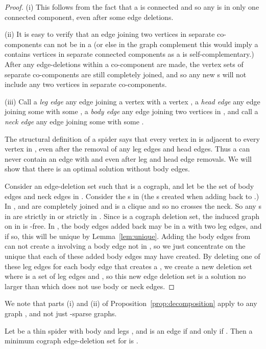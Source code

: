 \documentclass{llncs}
\begin{document}
\begin{proof}
 (i) This follows from the fact that a  is connected and so any  is in only one connected component, even after some edge deletions.

 (ii) It is easy to verify that an edge joining two vertices in separate co-components can not be in a  (or else in the graph complement this would imply a  contains vertices in separate connected components as a  is self-complementary.) After any edge-deletions within a co-component are made, the vertex sets of separate co-components are still completely joined, and so any new s will not include any two vertices in separate co-components.

 (iii) Call a \emph{leg edge} any edge joining a vertex  with a vertex , a \emph{head edge} any edge joining some  with some , a \emph{body edge} any edge joining two vertices in , and call a \emph{neck edge} any edge joining some  with some .
  
 The structural definition of a spider says that every vertex in  is adjacent to every vertex in , even after the removal of any leg edges and head edges. Thus a  can never contain an edge  with  and  even after leg and head edge removals. We will show that there is an optimal solution without body edges.
  
 Consider an edge-deletion set  such that  is a cograph, and let  be the set of body edges and neck edges in . Consider the s in  (the s created when adding  back to .) In ,  and  are completely joined and  is a clique and so no  crosses the neck. So any s in  are strictly in  or strictly in . Since  is a cograph deletion set, the induced graph on  in  is -free. In , the body edges added back may be in a  with two leg edges, and if so, this  will be unique by Lemma~\ref{lem:unique}. Adding the body edges from  can not create a  involving a body edge not in , so we just concentrate on the unique  that each of these added body edges may have created. By deleting one of these leg edges for each body edge that creates a , we create a new deletion set  where  is a set of leg edges and , so this new edge deletion set is a solution no larger than  which does not use body or neck edges.
 \hfill 
\end{proof}

We note that parts (i) and (ii) of Proposition~\ref{prop:decomposition} apply to any graph , and not just -sparse graphs.

\begin{lemma} \label{thin}
  Let  be a thin spider with body  and legs , and  is an edge if and only if . Then a minimum cograph edge-deletion set for  is .
\end{lemma}
\end{document}
